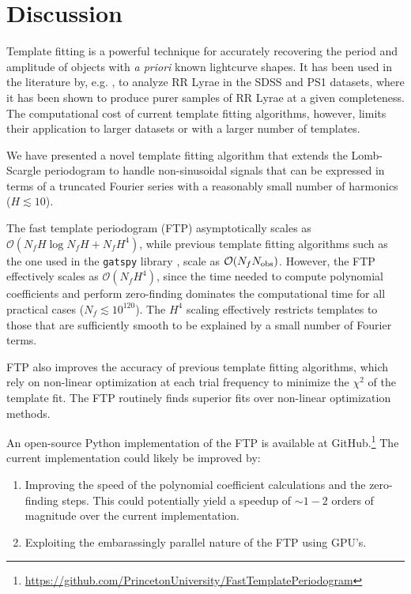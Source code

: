 \documentclass[apj]{emulateapj}
\newcommand{\bigO}{\mathcal{O}}
\begin{document}
 

\section{Discussion}\label{sec:discussion}

Template fitting is a powerful technique for accurately recovering
the period and amplitude of objects with \emph{a priori} known
lightcurve shapes. It has been used in the literature by, e.g.
\cite{Sesar_etal_2016, Sesar_etal_2010}, to analyze RR Lyrae in the
SDSS and PS1 datasets, where it has been shown to produce purer
samples of RR Lyrae at a given completeness. The computational
cost of current template fitting algorithms, however, limits their
application to larger datasets or with a larger number of templates.

We have presented a novel template fitting algorithm that extends
the Lomb-Scargle periodogram \citep{Lomb_1976,Scargle_1982,Barning_1963,Vanicek_1971}
to handle non-sinusoidal signals that can be expressed in terms of
a truncated Fourier series with a reasonably small number of harmonics
($H\lesssim 10$). 

The fast template periodogram (FTP) asymptotically scales as 
$\bigO(N_fH\log N_fH + N_fH^4)$, while previous template fitting algorithms
such as the one used in the \texttt{gatspy} library \citep{gatspy},
scale as $\bigO(N_fN_{\rm obs})$. However, the FTP effectively
scales as $\bigO(N_fH^4)$, since the time needed to compute polynomial
coefficients and perform zero-finding dominates the computational time
for all practical cases ($N_f \lesssim 10^{120}$).
The $H^4$ scaling effectively restricts templates to those that are
sufficiently smooth to be explained by a small number of Fourier terms.

FTP also improves the accuracy of previous template fitting algorithms, 
which rely on non-linear optimization at each trial frequency to minimize
the $\chi^2$ of the template fit. The FTP routinely finds superior fits over
non-linear optimization methods.

An open-source Python implementation of the FTP is available at
GitHub.\footnote{\url{https://github.com/PrincetonUniversity/FastTemplatePeriodogram}} 
The current implementation could likely be improved by:

\begin{enumerate}
    \item Improving the speed of the polynomial
          coefficient calculations and the zero-finding steps. This could potentially yield
          a speedup of $\sim1-2$ orders of magnitude over the current implementation.
    \item Exploiting the embarassingly parallel nature of the FTP using GPU's.
\end{enumerate}
\end{document}
